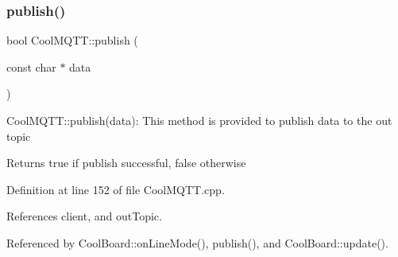 \subsubsection{\texorpdfstring{publish()}{publish()}\hspace{0.1cm}{\footnotesize\ttfamily [1/2]}}
{\footnotesize\ttfamily bool Cool\+M\+Q\+T\+T\+::publish (\begin{DoxyParamCaption}\item[{const char $\ast$}]{data }\end{DoxyParamCaption})}

Cool\+M\+Q\+T\+T\+::publish(data)\+: This method is provided to publish data to the out topic

\begin{DoxyReturn}{Returns}
true if publish successful, false otherwise 
\end{DoxyReturn}


Definition at line 152 of file Cool\+M\+Q\+T\+T.\+cpp.



References client, and out\+Topic.



Referenced by Cool\+Board\+::on\+Line\+Mode(), publish(), and Cool\+Board\+::update().


